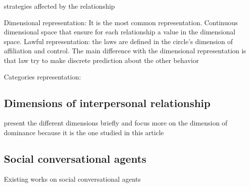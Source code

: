 \documentclass{llncs}
\begin{document}
strategies affected by the relationship

Dimensional representation: It is the most common representation.
Continuous dimensional space that ensure for each relationship a value in the dimensional space.
Lawful representation: the laws are defined in the circle's dimension of affiliation and control. The main difference with the dimensional representation is that law try to make discrete prediction about the other behavior 

Categories representation:



\subsection{Dimensions of interpersonal relationship}
present the different dimensions briefly and focus more on the dimension of dominance because it is the one studied in this article
\subsection{Social conversational agents}
 Existing works on social conversational agents
\noindent 
\vskip 4pt


\end{document}
